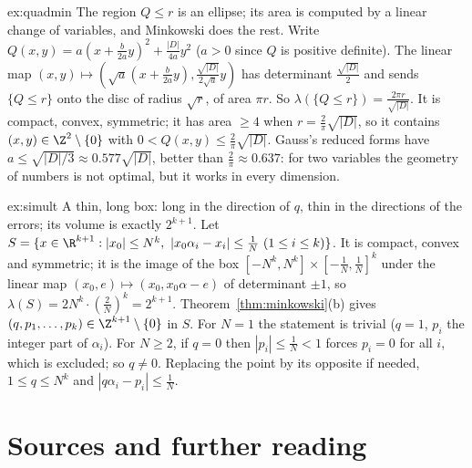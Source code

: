 \begin{solution}{ex:quadmin}
\idea The region $Q\le r$ is an ellipse; its area is computed by a linear change of variables, and Minkowski does the rest.
\writeup Write $Q(x,y)=a(x+\frac b{2a}y)^2+\frac{|D|}{4a}y^2$ ($a>0$ since $Q$ is positive definite). The linear map
$(x,y)\mapsto(\sqrt a(x+\frac b{2a}y),\frac{\sqrt{|D|}}{2\sqrt a}y)$ has determinant $\frac{\sqrt{|D|}}2$ and sends
$\{Q\le r\}$ onto the disc of radius $\sqrt r$, of area $\pi r$. So $\lambda(\{Q\le r\})=\frac{2\pi r}{\sqrt{|D|}}$. It is
compact, convex, symmetric; it has area $\ge4$ when $r=\frac2\pi\sqrt{|D|}$, so it contains $(x,y)\in\Z^2\setminus\{0\}$
with $0<Q(x,y)\le\frac2\pi\sqrt{|D|}$. Gauss's reduced forms have $a\le\sqrt{|D|/3}\approx0.577\sqrt{|D|}$, better than
$\frac2\pi\approx0.637$: for two variables the geometry of numbers is not optimal, but it works in every dimension.
\end{solution}

\begin{solution}{ex:simult}
\idea A thin, long box: long in the direction of $q$, thin in the directions of the errors; its volume is exactly $2^{k+1}$.
\writeup Let $S=\{x\in\R^{k+1}:|x_0|\le N^k,\ |x_0\alpha_i-x_i|\le\frac1N\ (1\le i\le k)\}$. It is compact, convex and
symmetric; it is the image of the box $[-N^k,N^k]\times[-\frac1N,\frac1N]^k$ under the linear map $(x_0,e)\mapsto(x_0,
x_0\alpha-e)$ of determinant $\pm1$, so $\lambda(S)=2N^k\cdot(\frac2N)^k=2^{k+1}$. Theorem~\ref{thm:minkowski}(b) gives
$(q,p_1,\dots,p_k)\in\Z^{k+1}\setminus\{0\}$ in $S$. For $N=1$ the statement is trivial ($q=1$, $p_i$ the integer part
of $\alpha_i$). For $N\ge2$, if $q=0$ then $|p_i|\le\frac1N<1$ forces $p_i=0$ for all $i$, which is excluded; so $q\ne0$. Replacing the point
by its opposite if needed, $1\le q\le N^k$ and $|q\alpha_i-p_i|\le\frac1N$.
\end{solution}

\section*{Sources and further reading}

